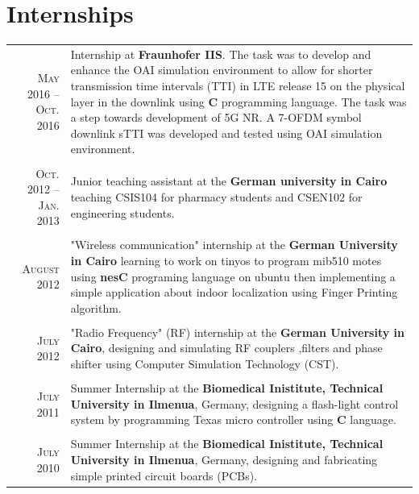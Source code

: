 \documentclass[a4paper,10pt]{article}
\begin{document}
\section{Internships}
\begin{tabular}{r|p{11cm}}
	\textsc{May 2016 – Oct. 2016} & Internship at {\bf Fraunhofer IIS}. The task was to develop and enhance the {OAI} simulation environment to allow for shorter transmission time intervals ({TTI}) in LTE release 15 on the physical layer in the downlink using {\bf C} programming language. The task was a step towards development of 5G NR. A 7-OFDM symbol downlink {sTTI} was developed and tested using OAI simulation environment. \\
	& \\ 
	\textsc{Oct. 2012 – Jan. 2013} & Junior teaching assistant at the {\bf German university in Cairo} teaching CSIS104 for pharmacy students and CSEN102 for engineering students. \\
	& \\
	\textsc{August} 2012 & "Wireless communication" internship at the {\bf German University in Cairo} learning to work on tinyos to program mib510 motes using \textbf{nesC} programing language on ubuntu then implementing a simple application about indoor localization using Finger Printing algorithm.\\
	& \\
	\textsc{July} 2012 & "Radio Frequency" (RF) internship at the {\bf German University in Cairo}, designing and simulating RF couplers ,filters and phase shifter using  Computer Simulation Technology (CST).\\ 
	& \\
	\textsc{July} 2011 & Summer Internship at the {\bf Biomedical Inistitute, Technical University in Ilmenua}, Germany, designing a flash-light control system by programming Texas micro controller using \textbf{C} language.\\ 
	& \\
	\textsc{July} 2010  & Summer Internship at the {\bf Biomedical Inistitute, Technical University in Ilmenua}, Germany, designing and fabricating simple printed circuit boards (PCBs).\\
	
\end{tabular}

\end{document}
